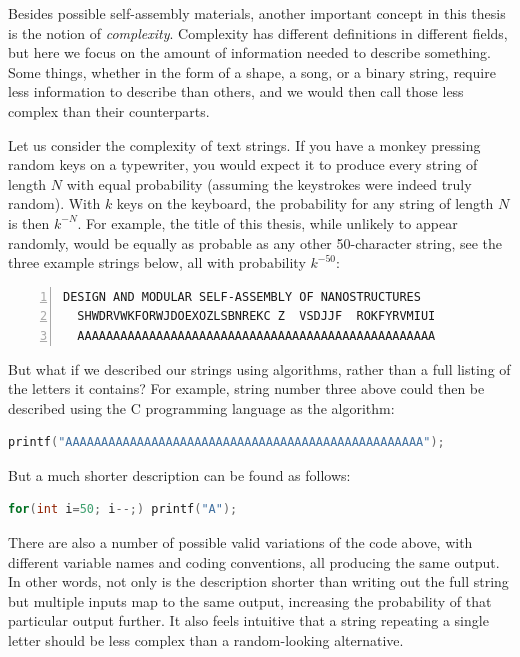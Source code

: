 


Besides possible self-assembly materials, another important concept in this thesis is the notion of \emph{complexity}. Complexity has different definitions in different fields, but here we focus on the amount of information needed to describe something. Some things, whether in the form of a shape, a song, or a binary string, require less information to describe than others, and we would then call those less complex than their counterparts.

Let us consider the complexity of text strings. If you have a monkey pressing random keys on a typewriter, you would expect it to produce every string of length \(N\) with equal probability (assuming the keystrokes were indeed truly random). With \(k\) keys on the keyboard, the probability for any string of length \(N\) is then \(k^{-N}\). For example, the title of this thesis, while unlikely to appear randomly, would be equally as probable as any other 50-character string, see the three example strings below, all with probability \(k^{-50}\):
\begin{lstlisting}[numbers=left]
  DESIGN AND MODULAR SELF-ASSEMBLY OF NANOSTRUCTURES
  SHWDRVWKFORWJDOEXOZLSBNREKC Z  VSDJJF  ROKFYRVMIUI
  AAAAAAAAAAAAAAAAAAAAAAAAAAAAAAAAAAAAAAAAAAAAAAAAAA
\end{lstlisting}

But what if we described our strings using algorithms, rather than a full listing of the letters it contains? For example, string number three above could then be described using the C programming language as the algorithm:

\begin{lstlisting}[language=c]
printf("AAAAAAAAAAAAAAAAAAAAAAAAAAAAAAAAAAAAAAAAAAAAAAAAAA");
\end{lstlisting}

But a much shorter description can be found as follows:

\begin{lstlisting}[language=c]
for(int i=50; i--;) printf("A");
\end{lstlisting}

There are also a number of possible valid variations of the code above, with different variable names and coding conventions, all producing the same output. In other words, not only is the description shorter than writing out the full string but multiple inputs map to the same output, increasing the probability of that particular output further. It also feels intuitive that a string repeating a single letter should be less complex than a random-looking alternative.

